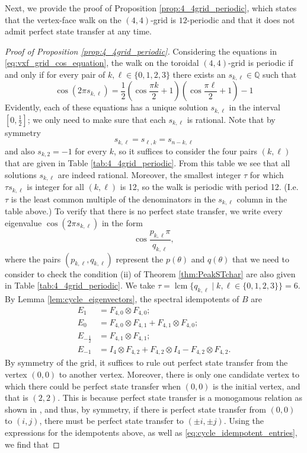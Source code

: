 \documentclass{article}
\numberwithin{equation}{section}
\DeclareMathOperator{\lcm}{lcm}
\newcommand\rats{{\mathbb Q}}
\begin{document}
Next, we provide the proof of Proposition \ref{prop:4_4grid_periodic}, which states that the vertex-face walk on the $(4,4)$-grid is $12$-periodic and that it does not admit perfect state transfer at any time.

\begin{proof}[Proof of Proposition \ref{prop:4_4grid_periodic}]
Considering the equations in \eqref{eq:vxf_grid_cos_equation}, the walk on the toroidal $(4,4)$-grid is periodic if and only if for every pair of $k,\ell \in \{0,1,2,3\}$ there exists an $s_{k,\ell} \in \rats$ such that
\[
\cos(2\pi s_{k,\ell}) = \frac{1}{2}\left(\cos \frac{ \pi k}{2} + 1\right)\left(\cos \frac{\pi \ell}{2} + 1\right) -1
\]
Evidently, each of these equations has a unique solution $s_{k,\ell}$ in the interval $[0,\frac{1}{2}]$; we only need to make sure that each $s_{k,\ell}$ is rational. Note that by symmetry
\[
s_{k,\ell} = s_{\ell,k} = s_{n-k,\ell}
\]
and also $s_{k,2} = -1$ for every $k$, so it suffices to consider the four pairs $(k,\ell)$ that are given in Table \ref{tab:4_4grid_periodic}. From this table we see that all solutions $s_{k,\ell}$ are indeed rational. Moreover, the smallest integer $\tau$ for which $\tau s_{k,\ell}$ is integer for all $(k,\ell)$ is 12, so the walk is periodic with period 12. (I.e.\ $\tau$ is the least common multiple of the denominators in the $s_{k,\ell}$ column in the table above.) To verify that there is no perfect state transfer, we write every eigenvalue $\cos(2\pi s_{k,\ell})$ in the form
\[
\cos\frac{p_{k,\ell}\pi}{q_{k,\ell}},
\]
where the pairs $(p_{k,\ell},q_{k,\ell})$ represent the $p(\theta)$ and $q(\theta)$ that we need to consider to check the condition (ii) of Theorem \ref{thm:PeakSTchar} are also given in Table \ref{tab:4_4grid_periodic}. We take $\tau = \lcm\{q_{k,\ell}\mid k,\ell \in \{0,1,2,3\}\} = 6$. By Lemma \ref{lem:cycle_eigenvectors}, the spectral idempotents of $B$ are
\[
\begin{split}
E_1 &= F_{4,0} \otimes F_{4,0};\\
E_{0} &= F_{4,0} \otimes F_{4,1} + F_{4,1} \otimes F_{4,0}; \\
E_{-\frac{1}{2}} &= F_{4,1} \otimes F_{4,1};\\
E_{-1} &= I_4 \otimes F_{4,2} + F_{4,2} \otimes I_4 - F_{4,2} \otimes F_{4,2}.
\end{split}
\]
By symmetry of the grid, it suffices to rule out perfect state transfer from the vertex $(0,0)$ to another vertex. Moreover, there is only one candidate vertex to which there could be perfect state transfer when $(0,0)$ is the initial vertex, and that is $(2,2)$. This is because perfect state transfer is a monogamous relation as shown in \cite[Theorem 4.5 (iii)]{GuoSch2024}, and thus, by symmetry, if there is perfect state transfer from $(0,0)$ to $(i,j)$, there must be perfect state transfer to $(\pm i, \pm j)$. Using the expressions for the idempotents above, as well as \eqref{eq:cycle_idempotent_entries}, we find that

\end{proof}
\end{document}

